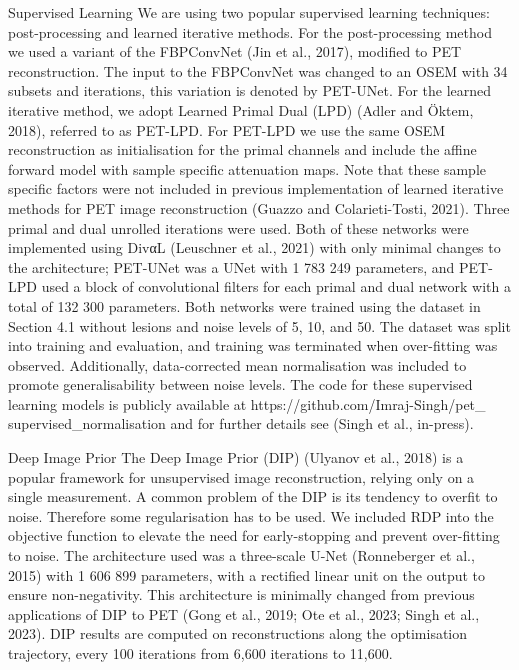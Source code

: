 \documentclass{article}
\begin{document}
Supervised Learning We are using two popular supervised learning techniques: post-processing and learned iterative methods. For the post-processing method we used a variant of the FBPConvNet (Jin et al., 2017), modified to PET reconstruction. The input to the FBPConvNet was changed to an OSEM with 34 subsets and iterations, this variation is denoted by PET-UNet. For the learned iterative method, we adopt Learned Primal Dual (LPD) (Adler and Öktem, 2018), referred to as PET-LPD. For PET-LPD we use the same OSEM reconstruction as initialisation for the primal channels and include the affine forward model with sample specific attenuation maps. Note that these sample specific factors were not included in previous implementation of learned iterative methods for PET image reconstruction (Guazzo and Colarieti-Tosti, 2021). Three primal and dual unrolled iterations were used. Both of these networks were implemented using DivαL (Leuschner et al., 2021) with only minimal changes to the architecture; PET-UNet was a UNet with 1 783 249 parameters, and PET-LPD used a block of convolutional filters for each primal and dual network with a total of 132 300 parameters. Both networks were trained using the dataset in Section 4.1 without lesions and noise levels of 5, 10, and 50. The dataset was split into training and evaluation, and training was terminated when over-fitting was observed. Additionally, data-corrected mean normalisation was included to promote generalisability between noise levels. The code for these supervised learning models is publicly available at https://github.com/Imraj-Singh/pet\_ supervised\_normalisation and for further details see (Singh et al., in-press).

Deep Image Prior The Deep Image Prior (DIP) (Ulyanov et al., 2018) is a popular framework for unsupervised image reconstruction, relying only on a single measurement. A common problem of the DIP is its tendency to overfit to noise. Therefore some regularisation has to be used. We included RDP into the objective function to elevate the need for early-stopping and prevent over-fitting to noise. The architecture used was a three-scale U-Net (Ronneberger et al., 2015) with 1 606 899 parameters, with a rectified linear unit on the output to ensure non-negativity. This architecture is minimally changed from previous applications of DIP to PET (Gong et al., 2019; Ote et al., 2023; Singh et al., 2023). DIP results are computed on reconstructions along the optimisation trajectory, every 100 iterations from 6,600 iterations to 11,600.
\end{document}
